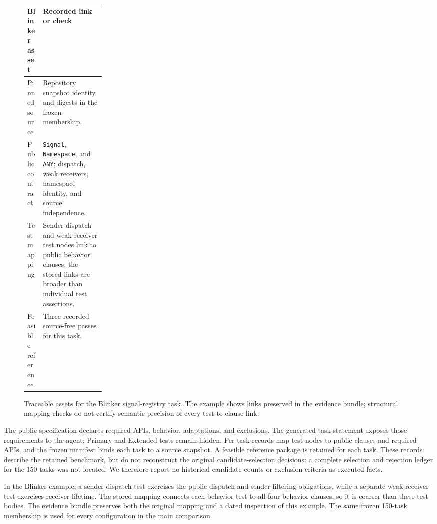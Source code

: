 \documentclass[acmsmall,screen,review,anonymous]{acmart}
\begin{document}
\begin{figure}[ht]
  \centering
  \footnotesize
  \setlength{\tabcolsep}{5pt}
  \renewcommand{\arraystretch}{1.12}
  \begin{tabularx}{\linewidth}{@{}p{0.20\linewidth}X@{}}
    \toprule
    \textbf{Blinker asset} & \textbf{Recorded link or check} \\
    \midrule
    Pinned source & Repository snapshot identity and digests in the frozen membership. \\
    Public contract & \texttt{Signal}, \texttt{Namespace}, and \texttt{ANY}; dispatch, weak receivers, namespace identity, and source independence. \\
    Test mapping & Sender dispatch and weak-receiver test nodes link to public behavior clauses; the stored links are broader than individual test assertions. \\
    Feasible reference & Three recorded source-free passes for this task. \\
    \bottomrule
  \end{tabularx}
  \caption{Traceable assets for the Blinker signal-registry task. The example
  shows links preserved in the evidence bundle; structural mapping checks do
  not certify semantic precision of every test-to-clause link.}
  \label{fig:construction}
\end{figure}

The public specification declares required APIs, behavior, adaptations, and
exclusions. The generated task statement exposes those requirements to the
agent; Primary and Extended tests remain hidden. Per-task records map test
nodes to public clauses and required APIs, and the frozen manifest binds each
task to a source snapshot. A feasible reference package is retained for each
task. These records describe the retained benchmark, but do not reconstruct the
original candidate-selection decisions: a complete selection and rejection
ledger for the 150 tasks was not located. We therefore report no historical
candidate counts or exclusion criteria as executed facts.

In the Blinker example, a sender-dispatch test exercises the public dispatch
and sender-filtering obligations, while a separate weak-receiver test exercises
receiver lifetime. The stored mapping connects each behavior test to all four
behavior clauses, so it is coarser than these test bodies. The evidence bundle
preserves both the original mapping and a dated inspection of this example.
The same frozen 150-task membership is used for every configuration in the main
comparison.
\end{document}
